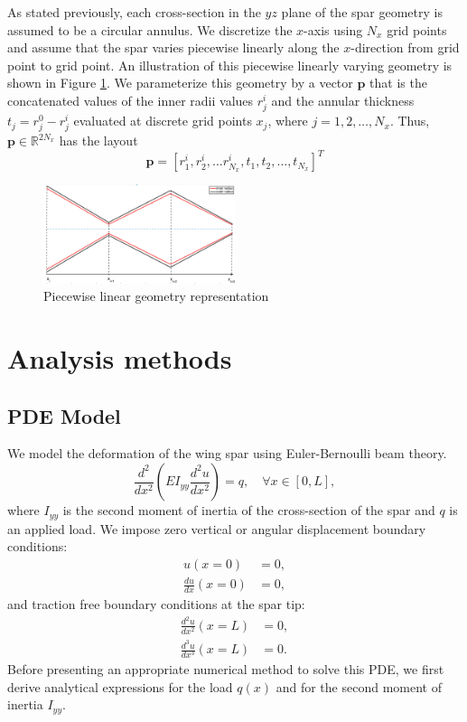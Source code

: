\documentclass[11pt]{article}
\newcommand{\bs}[1] {\boldsymbol{#1}}
\begin{document}
As stated previously, each cross-section in the $yz$ plane of the
spar geometry is assumed to be a circular annulus. We discretize
the $x$-axis using $N_x$ grid points and assume that the spar
varies piecewise linearly along the $x$-direction from grid
point to grid point. An illustration of this piecewise linearly
varying geometry is shown in Figure \ref{fig:representation}.
We parameterize this geometry by a vector $\bs{p}$
that is the concatenated values of the
inner radii values $r^i_j$ and the annular thickness
$t_j = r^0_j - r^i_j$ evaluated at discrete grid points $x_j$,
where $j=1,2,\dots,N_x$. Thus, $\bs{p} \in \mathbb{R}^{2 N_x}$
has the layout
\begin{equation}
\bs{p} = [r^i_1, r^i_2, \dots r^i_{N_x}, t_1, t_2, \dots, t_{N_x}]^T
\end{equation}

\begin{figure}[hbt]
\centering
\includegraphics[width=0.5\textwidth]{representation}
\caption{Piecewise linear geometry representation}
\label{fig:representation}
\end{figure}

\section{Analysis methods}

\subsection{PDE Model}

We model the deformation of the wing spar using Euler-Bernoulli
beam theory.
\begin{equation}
\frac{d^2}{d x^2}
\left( E I_{yy} \frac{d^2 u}{dx^2} \right) =
q, \quad \forall x \in [0,L],
\end{equation}
where $I_{yy}$ is the second moment of inertia of the
cross-section of the spar and $q$ is an applied load.
We impose zero vertical or angular displacement boundary
conditions:
\begin{equation}
\begin{aligned}
u(x=0) &= 0, \\
\frac{du}{dx} (x=0) &= 0,
\end{aligned}
\end{equation}
and traction free boundary conditions at the spar tip:
\begin{equation}
\begin{aligned}
\frac{d^2 u}{dx^2} (x=L) &= 0, \\
\frac{d^3 u}{dx^3} (x=L) &= 0.
\end{aligned}
\end{equation}
Before presenting an appropriate numerical method to
solve this PDE, we first derive analytical expressions
for the load $q(x)$ and for the second moment of inertia
$I_{yy}$.
\end{document}
